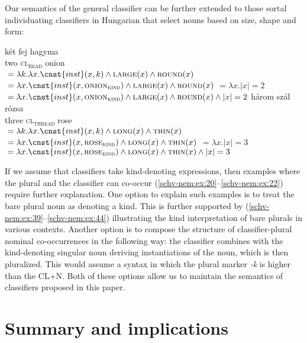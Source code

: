 \documentclass[output=paper]{langscibook}
\begin{document}
\noindent  Our semantics of the general classifier can be further extended to those sortal individuating classifiers in Hungarian that select nouns based on size, shape and form:

\ea \label{schv-nem:ex:51}
\ea
\gll két fej hagyma \\
two \textsc{cl\textsubscript{head}} onion\\
\ex {}${} = \lambda k. \lambda x.\cnst{inst}(x,k) \wedge \textsc{large}(x) \wedge \textsc{round}(x)$
\ex {}${} = \lambda x.\cnst{inst}(x,\textsc{onion}_{\textsc{kind}}) \wedge \textsc{large}(x) \wedge \textsc{round}(x)$
\ex {}${} = \lambda x.  |x| =2$
\ex {}\\${} =  \lambda x.\cnst{inst}(x,\textsc{onion}_{\textsc{kind}})\wedge \textsc{large}(x) \wedge \textsc{round}(x) \wedge |x| =2$
\z
\ex \label{schv-nem:ex:52}
\ea
\gll három szál rózsa \\
three \textsc{cl\textsubscript{thread}} rose\\
\ex {}${} = \lambda k. \lambda x.\cnst{inst}(x,k) \wedge \textsc{long}(x) \wedge \textsc{thin}(x)$
\ex {}${} = \lambda x.\cnst{inst}(x,\textsc{rose}_{\textsc{kind}}) \wedge \textsc{long}(x) \wedge \textsc{thin}(x)$
\ex {}${} = \lambda x.  |x| =3$
\ex {}\\${} =  \lambda x.\cnst{inst}(x,\textsc{rose}_{\textsc{kind}}) \wedge \textsc{long}(x) \wedge \textsc{thin}(x) \wedge |x| =3$
\z
\z

\begin{sloppypar}
\noindent If we assume that classifiers take kind-denoting expressions, then examples where the plural and the classifier can co-occur (\ref{schv-nem:ex:20}--\ref{schv-nem:ex:22}) require further explanation. One option to explain such examples is to treat the bare plural noun as denoting a kind. This is further supported by (\ref{schv-nem:ex:39}--\ref{schv-nem:ex:44}) illustrating the kind interpretation of bare plurals in various contexts. Another option is to compose the structure of classifier-plural nominal co-occurrences in the following way: the classifier combines with the kind-denoting singular noun deriving instantiations of the noun, which is then pluralized. This would assume a syntax in which the plural marker \textit{-k} is higher than the CL+N. Both of these options allow us to maintain the semantics of classifiers proposed in this paper.
\end{sloppypar}

\section{Summary and implications} \label{schv-nem:sec:6}
\end{document}

